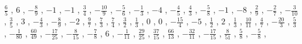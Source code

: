 \documentclass[12pt,fleqn]{article}
\theoremstyle{aufg}
\theoremstyle{bsp}
\begin{document}
\begin{flushleft}
$ \scriptstyle\frac{6}{5}$ , $ \scriptstyle6$ , $ \scriptstyle- \frac{8}{9}$ , $ \scriptstyle-1$ , $ \scriptstyle-1$ , $ \scriptstyle\frac{3}{4}$ , $ \scriptstyle- \frac{10}{9}$ , $ \scriptstyle- \frac{5}{6}$ , $ \scriptstyle- \frac{1}{3}$ , $ \scriptstyle-4$ , $ \scriptstyle- \frac{4}{5}$ , $ \scriptstyle\frac{4}{3}$ , $ \scriptstyle- \frac{5}{8}$ , $ \scriptstyle-1$ , $ \scriptstyle-8$ , $ \scriptstyle\frac{2}{9}$ , $ \scriptstyle- \frac{2}{7}$ , $ \scriptstyle- \frac{3}{10}$ , $ \scriptstyle\frac{3}{5}$ , $ \scriptstyle3$ , $ \scriptstyle- \frac{4}{3}$ , $ \scriptstyle- \frac{8}{9}$ , $ \scriptstyle-2$ , $ \scriptstyle\frac{9}{7}$ , $ \scriptstyle\frac{7}{3}$ , $ \scriptstyle\frac{7}{4}$ , $ \scriptstyle\frac{3}{2}$ , $ \scriptstyle\frac{1}{3}$ , $ \scriptstyle0$ , $ \scriptstyle0$ , $ \scriptstyle- \frac{15}{4}$ , $ \scriptstyle-5$ , $ \scriptstyle\frac{1}{2}$ , $ \scriptstyle2$ , $ \scriptstyle\frac{1}{3}$ , $ \scriptstyle\frac{10}{11}$ , $ \scriptstyle\frac{4}{7}$ , $ \scriptstyle- \frac{20}{3}$ , $ \scriptstyle\frac{5}{3}$ , $ \scriptstyle- \frac{1}{80}$ , $ \scriptstyle\frac{60}{49}$ , $ \scriptstyle- \frac{17}{25}$ , $ \scriptstyle- \frac{8}{15}$ , $ \scriptstyle- \frac{7}{8}$ , $ \scriptstyle6$ , $ \scriptstyle- \frac{1}{11}$ , $ \scriptstyle\frac{29}{25}$ , $ \scriptstyle\frac{37}{15}$ , $ \scriptstyle\frac{66}{13}$ , $ \scriptstyle- \frac{32}{11}$ , $ \scriptstyle- \frac{17}{15}$ , $ \scriptstyle\frac{8}{51}$ , $ \scriptstyle\frac{5}{8}$ , $ \scriptstyle- \frac{5}{8}$ , \end{flushleft} 
\end{document}
